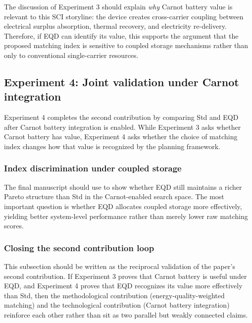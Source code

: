 The discussion of Experiment 3 should explain \emph{why} Carnot battery value is relevant to this SCI storyline: the device creates cross-carrier coupling between electrical surplus absorption, thermal recovery, and electricity re-delivery. Therefore, if EQD can identify its value, this supports the argument that the proposed matching index is sensitive to coupled storage mechanisms rather than only to conventional single-carrier resources.


\subsection{Experiment 4: Joint validation under Carnot integration}
\label{sec:exp4}

Experiment 4 completes the second contribution by comparing Std and EQD after Carnot battery integration is enabled. While Experiment 3 asks whether Carnot battery has value, Experiment 4 asks whether the choice of matching index changes how that value is recognized by the planning framework.

\subsubsection{Index discrimination under coupled storage}

The final manuscript should use  to show whether EQD still maintains a richer Pareto structure than Std in the Carnot-enabled search space. The most important question is whether EQD allocates coupled storage more effectively, yielding better system-level performance rather than merely lower raw matching scores.

\subsubsection{Closing the second contribution loop}

This subsection should be written as the reciprocal validation of the paper's second contribution. If Experiment 3 proves that Carnot battery is useful under EQD, and Experiment 4 proves that EQD recognizes its value more effectively than Std, then the methodological contribution (energy-quality-weighted matching) and the technological contribution (Carnot battery integration) reinforce each other rather than sit as two parallel but weakly connected claims.

